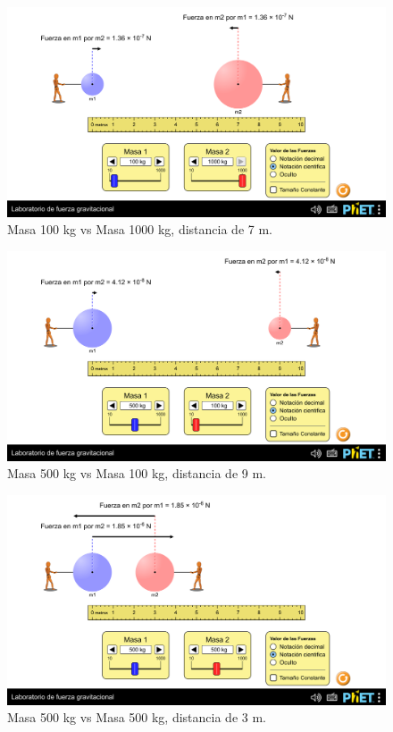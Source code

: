 \documentclass[a4paper,12pt]{article}
\begin{document}
\begin{figure}[h]
    \centering
    \includegraphics[width=1\linewidth]{m1_100_m2_1000_r_7.png}
    \caption{Masa 100 kg vs Masa 1000 kg, distancia de 7 m.}
\end{figure}

\begin{figure}[h]
    \centering
    \includegraphics[width=1\linewidth]{m1_500_m2_100_r_9.png}
    \caption{Masa 500 kg vs Masa 100 kg, distancia de 9 m.}
\end{figure}

\begin{figure}[h]
    \centering
    \includegraphics[width=1\linewidth]{m1_500_m2_500_r_3.png}
    \caption{Masa 500 kg vs Masa 500 kg, distancia de 3 m.}
\end{figure}
\end{document}
